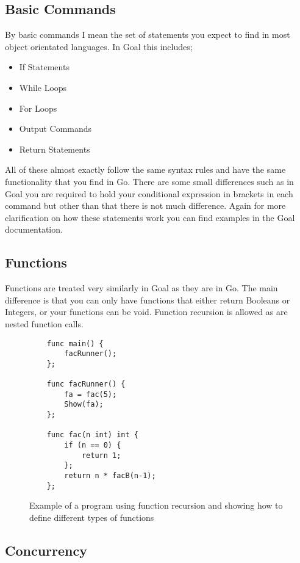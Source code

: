 \subsection{Basic Commands}

By basic commands I mean the set of statements you expect to find in most object orientated languages. In Goal this includes;

\begin{itemize}
	\item If Statements
	\item While Loops
	\item For Loops
	\item Output Commands
	\item Return Statements 
\end{itemize}

All of these almost exactly follow the same syntax rules and have the same functionality that you find in Go. There are some small differences such as in Goal you are required to hold your conditional expression in brackets in each command but other than that there is not much difference. Again for more clarification on how these statements work you can find examples in the Goal documentation.

\subsection{Functions}

Functions are treated very similarly in Goal as they are in Go. The main difference is that you can only have functions that either return Booleans or Integers, or your functions can be void. Function recursion is allowed as are nested function calls.

\begin{figure}
\begin{lstlisting}
	func main() {
	    facRunner();
	};
	
	func facRunner() {
	    fa = fac(5);
	    Show(fa);
	};
	
	func fac(n int) int {
	    if (n == 0) {
	        return 1;
	    }; 
	    return n * facB(n-1);
	};
\end{lstlisting}
\caption{Example of a program using function recursion and showing how to define different types of functions}
\label{fig:egGoalFunction} 
\end{figure}

\subsection{Concurrency}
\label{sec:concDes}

